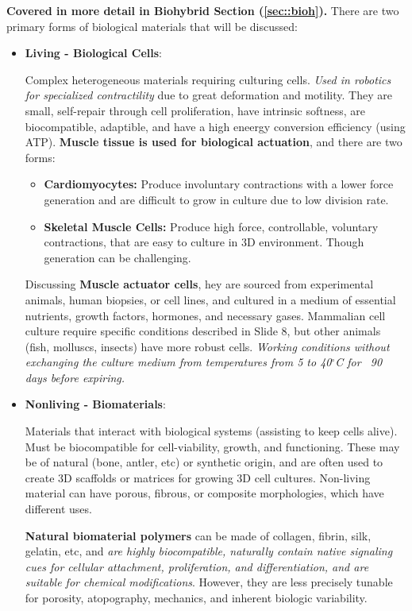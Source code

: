 \documentclass[onecolumn,a4paper]{article}
\begin{document}
\textbf{Covered in more detail in Biohybrid Section (\ref{sec::bioh}).} There are two primary forms of biological materials that will be discussed:
\begin{itemize}
    \item \textbf{Living - Biological Cells}: 
    
    Complex heterogeneous materials requiring culturing cells. \emph{Used in robotics for specialized contractility} due to great deformation and motility. They are small, self-repair through cell proliferation, have intrinsic softness, are biocompatible, adaptible, and have a high eneergy conversion efficiency (using ATP). \textbf{Muscle tissue is used for biological actuation}, and there are two forms:
    
    \begin{itemize}
        \item \textbf{Cardiomyocytes:} Produce involuntary contractions with a lower force generation and are difficult to grow in culture due to low division rate.
        \item \textbf{Skeletal Muscle Cells:} Produce high force, controllable, voluntary contractions, that are easy to culture in 3D environment. Though generation can be challenging.
    \end{itemize}

    Discussing \textbf{Muscle actuator cells}, hey are sourced from experimental animals, human biopsies, or cell lines, and cultured in a medium of essential nutrients, growth factors, hormones, and necessary gases. Mammalian cell culture require specific conditions described in Slide 8, but other animals (fish, molluscs, insects) have more robust cells. \emph{Working conditions without exchanging the culture medium from temperatures from 5 to 40$^\circ$C for ~90 days before expiring.}

    \item \textbf{Nonliving - Biomaterials}:

    Materials that interact with biological systems (assisting to keep cells alive). Must be biocompatible for cell-viability, growth, and functioning. These may be of natural (bone, antler, etc) or synthetic origin, and are often used to create 3D scaffolds or matrices for growing 3D cell cultures. Non-living material can have porous, fibrous, or composite morphologies, which have different uses.

    \textbf{Natural biomaterial polymers} can be made of collagen, fibrin, silk, gelatin, etc, and \emph{ are highly biocompatible, naturally contain native signaling cues for cellular attachment, proliferation, and differentiation, and are suitable for chemical modifications}. However, they are less precisely tunable for porosity, atopography, mechanics, and inherent biologic variability.


\end{itemize}
\end{document}
